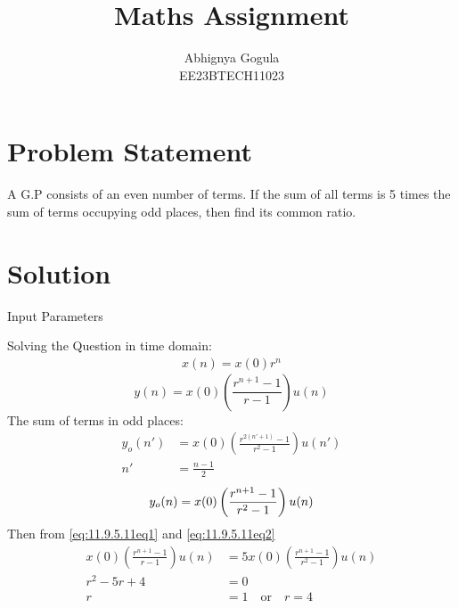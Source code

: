 \documentclass{article}
\begin{document}
\title{Maths Assignment}
\author{Abhignya Gogula\\
        EE23BTECH11023}
\maketitle
\section*{Problem Statement}
A G.P consists of an even number of terms. If the sum of all terms is 5 times the sum of terms occupying odd places, then find its common ratio.
\section*{Solution}
\begin{table}[h!]
\centering

\caption{Input Parameters}
\label{11.9.5.11tab1}
\end{table}
Solving the Question in time domain:
\begin{align}
x(n) = x(0)r^n 
\end{align}
\begin{equation}
y(n) = x(0)(\frac{r^{n+1}-1}{r-1})u(n)
\label{eq:11.9.5.11eq1}
\end{equation}
The sum of terms in odd places:
\begin{align}
y_o(n') &= x(0)\left(\frac{r^{2(n'+1)}-1}{r^2-1}\right)u(n')\\
n'&=\frac{n-1}{2}
\end{align}
\begin{equation}
y_o(n) = x(0)\left(\frac{r^{n+1}-1}{r^2-1}\right)u(n)\\
\label{eq:11.9.5.11eq2}
\end{equation}
Then from \eqref{eq:11.9.5.11eq1} and \eqref{eq:11.9.5.11eq2}
\begin{align}
x(0)(\frac{r^{n+1}-1}{r-1})u(n)&=5x(0)(\frac{r^{n+1}-1}{r^2-1})u(n)\\
r^2-5r+4&=0\\
r&=1 \quad \text{or} \quad r=4
\end{align}
\end{document}

